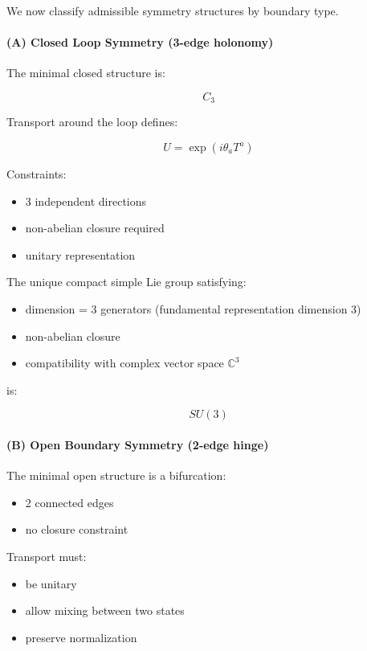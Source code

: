 \documentclass[
]{article}
\providecommand{\tightlist}{%
  \setlength{\itemsep}{0pt}\setlength{\parskip}{0pt}}
\begin{document}
We now classify admissible symmetry structures by boundary type.

\paragraph{(A) Closed Loop Symmetry (3-edge
holonomy)}\label{a-closed-loop-symmetry-3-edge-holonomy}

The minimal closed structure is:

\[
C_3
\]

Transport around the loop defines:

\[
U = \exp(i \theta_a T^a)
\]

Constraints:

\begin{itemize}
\tightlist
\item
  3 independent directions
\item
  non-abelian closure required
\item
  unitary representation
\end{itemize}

The unique compact simple Lie group satisfying:

\begin{itemize}
\tightlist
\item
  dimension = 3 generators (fundamental representation dimension 3)
\item
  non-abelian closure
\item
  compatibility with complex vector space \(\mathbb{C}^3\)
\end{itemize}

is:

\[
SU(3)
\]

\paragraph{(B) Open Boundary Symmetry (2-edge
hinge)}\label{b-open-boundary-symmetry-2-edge-hinge}

The minimal open structure is a bifurcation:

\begin{itemize}
\tightlist
\item
  2 connected edges
\item
  no closure constraint
\end{itemize}

Transport must:

\begin{itemize}
\tightlist
\item
  be unitary
\item
  allow mixing between two states
\item
  preserve normalization
\end{itemize}
\end{document}
